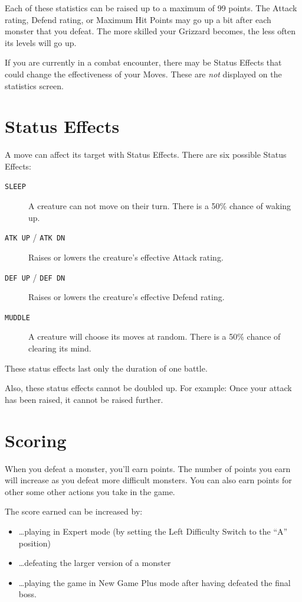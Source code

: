 \documentclass[10pt,twocolumn,openany,article]{memoir}
\begin{document}
Each of  these statistics can  be raised up to  a maximum of  99 points.
The Attack  rating, Defend  rating, or  Maximum Hit  Points may  go up
a bit after each monster that you defeat. The more skilled your Grizzard
becomes, the less often its levels will go up.

If you are currently in a  combat encounter, there may be Status Effects
that could change the effectiveness  of your Moves. These are \emph{not}
displayed on the statistics screen.

\section{Status Effects}\label{sec:StatusEffects}

A move can affect its target with Status Effects. There are six possible
Status Effects:

\begin{description}
\item[\texttt{SLEEP}] A  creature can not  move on their turn.  There is
  a 50\% chance of waking up.
\item[\texttt{ATK UP} / \texttt{ATK DN}] Raises or lowers the creature's
  effective Attack rating.
\item[\texttt{DEF UP} / \texttt{DEF DN}] Raises or lowers the creature's
  effective Defend rating.
\item[\texttt{MUDDLE}]  A  creature will  choose  its  moves at  random.
  There is a 50\% chance of clearing its mind.
\end{description}

These status effects last only the duration of one battle.

Also, these status effects cannot be  doubled up. For example: Once your
attack has been raised, it cannot be raised further.

\section{Scoring}

When you  defeat a monster, you'll  earn points. The number  of points
you earn  will increase as you  defeat more difficult monsters.  You can
also earn points for other some other actions you take in the game.

The score earned can be increased by:

\begin{itemize}
\item \ldots{}playing  in Expert  mode (by  setting the  Left Difficulty
  Switch to the ``A'' position)
\item \ldots{}defeating the larger version of a monster
\item  \ldots{}playing the  game  in  New Game  Plus  mode after  having
  defeated the final boss.
\end{itemize}
\end{document}
